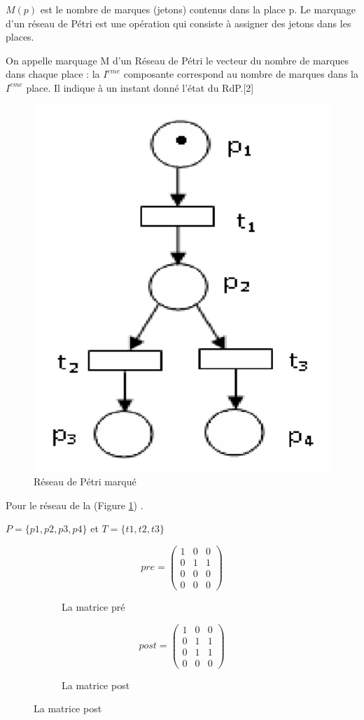 $ M(p) $ est le nombre de marques (jetons) contenus dans la place p. Le marquage d’un réseau de Pétri est une opération qui consiste à assigner des jetons dans les places.

On appelle marquage M d’un Réseau de Pétri le vecteur du nombre de marques dans chaque place : la $ I^{eme} $ composante  correspond au nombre de marques dans la $ I^{eme} $   place. Il indique à un instant donné l'état du RdP.[2]   


\begin{exmp}
 

\begin{figure}[H]
	\centering
	\includegraphics[width=0.4\linewidth]{images/pitref02PNG}
	\caption{ Réseau de Pétri marqué }
	\label{fig:pitref02png}
\end{figure}

Pour le réseau de la (Figure \ref{fig:pitref02png}) .

$ P= \{p1, p2, p3, p4\}$ et $T= \{t1, t2, t3\}  $

 
 \begin{figure}[H]
 	\centering
 	
 	\begin{subfigure}[b]{0.4\textwidth}
 	 \[
 	 pre=
 	 \begin{pmatrix}
 	 1 & 0 & 0 \\
 	 0 & 1 & 1 \\
 	 0 & 0 & 0 \\
 	 0 & 0 & 0
 	 \end{pmatrix}
 	 \]
 	  		\caption{La matrice pré}
 	\end{subfigure}
 	\hfill
 	\begin{subfigure}[b]{0.4\textwidth}
 \[	post=
 	\begin{pmatrix}
 		1 & 0 & 0 \\
 		0 & 1 & 1 \\
 		0 & 1 & 1 \\
 		0 & 0 & 0 
 	\end{pmatrix}
 	\]
 		\caption{La matrice post}
 	\end{subfigure}
 


\end{figure}
\end{exmp}

